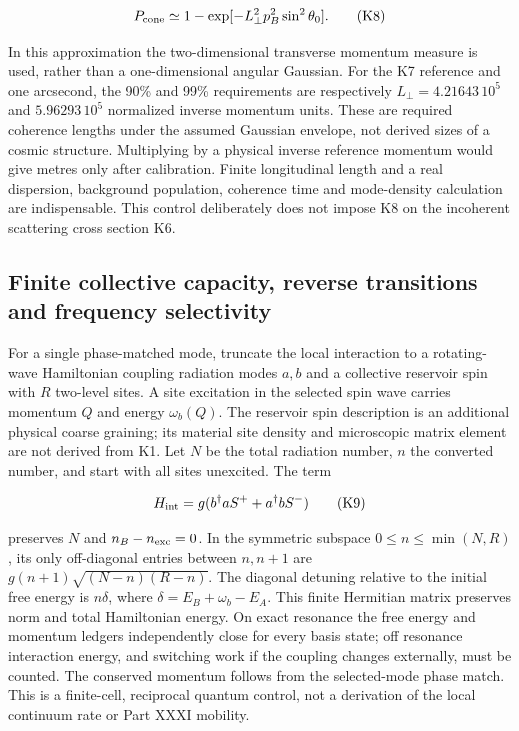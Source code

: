 \documentclass[
  11pt,
  twoside]{article}
\begin{document}
\[P_{\rm cone}\simeq 1-\exp[-L_\perp^2p_B^2\sin^2\theta_0].\tag{K8}\]

In this approximation the two-dimensional transverse momentum measure is
used, rather than a one-dimensional angular Gaussian. For the K7
reference and one arcsecond, the 90\% and 99\% requirements are
respectively \(L_\perp=4.21643\,10^5\) and \(5.96293\,10^5\) normalized
inverse momentum units. These are required coherence lengths under the
assumed Gaussian envelope, not derived sizes of a cosmic structure.
Multiplying by a physical inverse reference momentum would give metres
only after calibration. Finite longitudinal length and a real
dispersion, background population, coherence time and mode-density
calculation are indispensable. This control deliberately does not impose
K8 on the incoherent scattering cross section K6.

\subsection{Finite collective capacity, reverse transitions and
frequency
selectivity}\label{finite-collective-capacity-reverse-transitions-and-frequency-selectivity}

For a single phase-matched mode, truncate the local interaction to a
rotating-wave Hamiltonian coupling radiation modes \(a,b\) and a
collective reservoir spin with \(R\) two-level sites. A site excitation
in the selected spin wave carries momentum \(Q\) and energy
\(\omega_b(Q)\). The reservoir spin description is an additional
physical coarse graining; its material site density and microscopic
matrix element are not derived from K1. Let \(N\) be the total radiation
number, \(n\) the converted number, and start with all sites unexcited.
The term

\[H_{\rm int}=g(b^\dagger a S^+ + a^\dagger b S^-)\tag{K9}\]

preserves \(N\) and \(n_B-n_{\rm exc}=0\). In the symmetric subspace
\(0\leq n\leq\min(N,R)\), its only off-diagonal entries between
\(n,n+1\) are \(g(n+1)\sqrt{(N-n)(R-n)}\). The diagonal detuning
relative to the initial free energy is \(n\delta\), where
\(\delta=E_B+\omega_b-E_A\). This finite Hermitian matrix preserves norm
and total Hamiltonian energy. On exact resonance the free energy and
momentum ledgers independently close for every basis state; off
resonance interaction energy, and switching work if the coupling changes
externally, must be counted. The conserved momentum follows from the
selected-mode phase match. This is a finite-cell, reciprocal quantum
control, not a derivation of the local continuum rate or Part XXXI
mobility.
\end{document}
